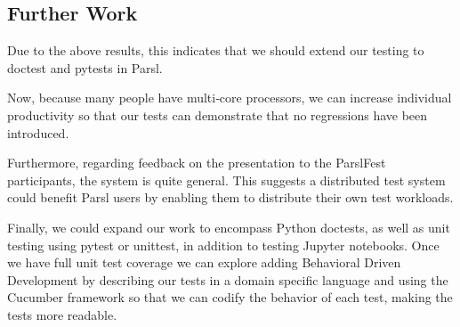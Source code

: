 
\subsection{Further Work}

Due to the above results, this indicates that we should extend our testing to doctest and pytests in Parsl.

Now, because many people have multi‑core processors, we can increase individual productivity so that our tests can demonstrate that no regressions have been introduced.

Furthermore, regarding feedback on the presentation to the ParslFest participants, the system is quite general. This suggests a distributed test system could benefit Parsl users by enabling them to distribute their own test workloads.

Finally, we could expand our work to encompass Python doctests, as well as unit testing using pytest or unittest, in addition to testing Jupyter notebooks. Once we have full unit test coverage we can explore adding Behavioral Driven Development by describing our tests in a domain specific language and using the Cucumber framework \cite{cucumber2025} so that we can codify the behavior of each test, making the tests more readable.







